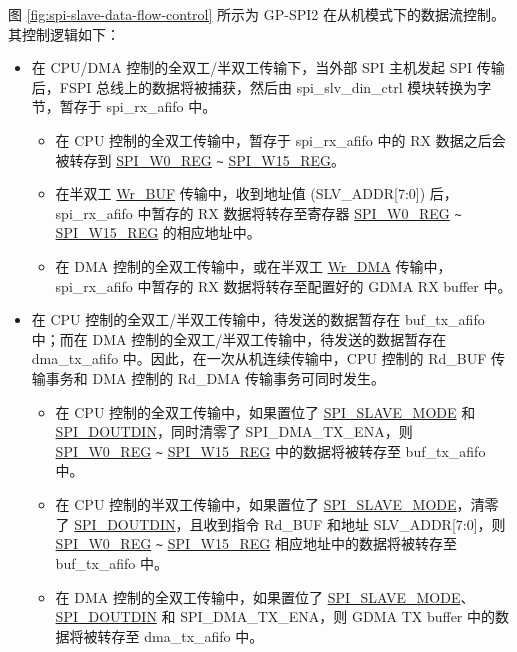\documentclass[main\_\_CN.tex]{subfiles}
\begin{document}
图 \ref{fig:spi-slave-data-flow-control} 所示为 GP-SPI2 在从机模式下的数据流控制。其控制逻辑如下：
\begin{itemize}
    \item 在 CPU/DMA 控制的全双工/半双工传输下，当外部 SPI 主机发起 SPI 传输后，FSPI 总线上的数据将被捕获，然后由 spi\_slv\_din\_ctrl 模块转换为字节，暂存于 spi\_rx\_afifo 中。
    \begin{itemize}
        \item 在 CPU 控制的全双工传输中，暂存于 spi\_rx\_afifo 中的 RX 数据之后会被转存到 \hyperref[regdesc:SPIW0REG]{SPI\_W0\_REG} \verb+~+ \hyperref[regdesc:SPIW15REG]{SPI\_W15\_REG}。

        \item 在半双工 \hyperref[cmd:wrbuf]{Wr\_BUF} 传输中，收到地址值 (SLV\_ADDR[7:0]) 后，spi\_rx\_afifo 中暂存的 RX 数据将转存至寄存器 \hyperref[regdesc:SPIW0REG]{SPI\_W0\_REG} \verb+~+ \hyperref[regdesc:SPIW15REG]{SPI\_W15\_REG} 的相应地址中。


        \item 在 DMA 控制的全双工传输中，或在半双工 \hyperref[cmd:wrdma]{Wr\_DMA} 传输中，spi\_rx\_afifo 中暂存的 RX 数据将转存至配置好的 GDMA RX buffer 中。

    \end{itemize}

    \item 在 CPU 控制的全双工/半双工传输中，待发送的数据暂存在 buf\_tx\_afifo 中；而在 DMA 控制的全双工/半双工传输中，待发送的数据暂存在 dma\_tx\_afifo 中。因此，在一次从机连续传输中，CPU 控制的 Rd\_BUF 传输事务和 DMA 控制的 Rd\_DMA 传输事务可同时发生。
    \begin{itemize}
        \item 在 CPU 控制的全双工传输中，如果置位了 \hyperref[fielddesc:SPISLAVEMODE]{SPI\_SLAVE\_MODE} 和 \hyperref[fielddesc:SPIDOUTDIN]{SPI\_DOUTDIN}，同时清零了 SPI\_DMA\_TX\_ENA，则 \hyperref[regdesc:SPIW0REG]{SPI\_W0\_REG} \verb+~+ \hyperref[regdesc:SPIW15REG]{SPI\_W15\_REG} 中的数据将被转存至 buf\_tx\_afifo 中。

        \item 在 CPU 控制的半双工传输中，如果置位了 \hyperref[fielddesc:SPISLAVEMODE]{SPI\_SLAVE\_MODE}，清零了 \hyperref[fielddesc:SPIDOUTDIN]{SPI\_DOUTDIN}，且收到指令 Rd\_BUF 和地址 SLV\_ADDR[7:0]，则 \hyperref[regdesc:SPIW0REG]{SPI\_W0\_REG} \verb+~+ \hyperref[regdesc:SPIW15REG]{SPI\_W15\_REG} 相应地址中的数据将被转存至 buf\_tx\_afifo 中。

        \item 在 DMA 控制的全双工传输中，如果置位了 \hyperref[fielddesc:SPISLAVEMODE]{SPI\_SLAVE\_MODE}、\hyperref[fielddesc:SPIDOUTDIN]{SPI\_DOUTDIN} 和 SPI\_DMA\_TX\_ENA，则 GDMA TX buffer 中的数据将被转存至 dma\_tx\_afifo 中。


\end{itemize}
\end{itemize}
\end{document}
